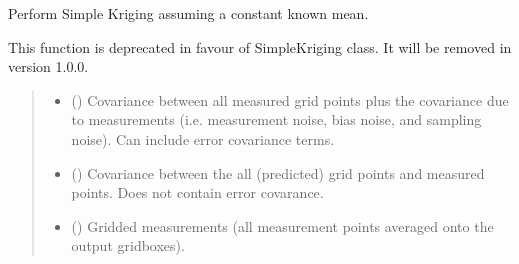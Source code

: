 \documentclass[letterpaper,10pt,english]{sphinxmanual}
\begin{document}

\begin{fulllineitems}
\label{\detokenize{kriging:glomar_gridding.kriging.kriging_simple}}
\pysigstartsignatures
\pysiglinewithargsret
{}
{\sphinxparamcomma {}\sphinxparamcomma {}\sphinxparamcomma {}\sphinxparamcomma {}}
{}
\pysigstopsignatures
\sphinxAtStartPar
Perform Simple Kriging assuming a constant known mean.

\sphinxAtStartPar
This function is deprecated in favour of SimpleKriging class. It will be
removed in version 1.0.0.
\begin{quote}\begin{description}
\begin{itemize}
\item {}
\sphinxAtStartPar
{} (\sphinxstyleliteralemphasis{\sphinxupquote{{[}}}\sphinxstyleliteralemphasis{\sphinxupquote{{]}}}) \textendash{} Covariance between all measured grid points plus the
covariance due to measurements (i.e. measurement noise, bias noise, and
sampling noise). Can include error covariance terms.

\item {}
\sphinxAtStartPar
{} (\sphinxstyleliteralemphasis{\sphinxupquote{{[}}}\sphinxstyleliteralemphasis{\sphinxupquote{{]}}}) \textendash{} Covariance between the all (predicted) grid points and measured points.
Does not contain error covarance.

\item {}
\sphinxAtStartPar
{} (\sphinxstyleliteralemphasis{\sphinxupquote{{[}}}\sphinxstyleliteralemphasis{\sphinxupquote{{]}}}) \textendash{} Gridded measurements (all measurement points averaged onto the output
gridboxes).


\end{itemize}
\end{description}
\end{quote}
\end{fulllineitems}
\end{document}
